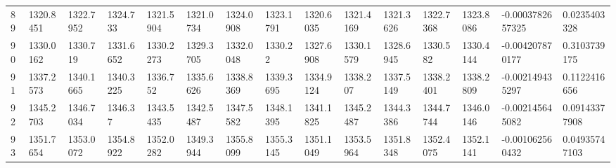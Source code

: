 \begin{landscape}
{\begin{longtable}{@{}lllllllllllllll@{}}
		89                                           & 1320.8451                & 1322.7952                & 1324.733                 & 1321.5904                & 1321.0734                & 1324.0908                & 1323.1791                & 1320.6035                & 1321.4169                & 1321.3626                & 1322.7368                & 1323.8086                & -0.0003782657325                                                       & 0.0235403328                                    \\
		90                                           & 1330.0162                & 1330.719                 & 1331.6652                & 1330.2273                & 1329.3705                & 1332.0048                & 1330.22                  & 1327.6908                & 1330.1579                & 1328.6945                & 1330.582                 & 1330.4144                & -0.004207870177                                                        & 0.3103739175                                    \\
		91                                           & 1337.2573                & 1340.1665                & 1340.3225                & 1336.752                 & 1335.6626                & 1338.8369                & 1339.3695                & 1334.9124                & 1338.207                 & 1337.5149                & 1338.2401                & 1338.2809                & -0.002149435297                                                        & 0.1122416656                                    \\
		92                                           & 1345.2703                & 1346.7034                & 1346.37                  & 1343.5435                & 1342.5487                & 1347.5582                & 1348.1395                & 1341.1825                & 1345.2487                & 1344.3386                & 1344.7744                & 1346.0146                & -0.002145645082                                                        & 0.09143377908                                   \\
		93                                           & 1351.7654                & 1353.0072                & 1354.8922                & 1352.0282                & 1349.3944                & 1355.8099                & 1355.3145                & 1351.1049                & 1353.5964                & 1351.8348                & 1352.4075                & 1352.1141                & -0.001062560432                                                        & 0.04935747103                                   \\

\end{longtable}}
\end{landscape}
